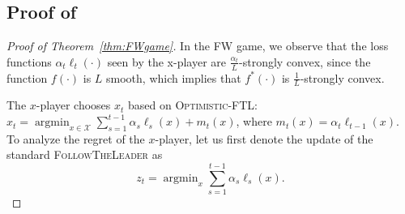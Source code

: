 \documentclass[pmlr]{jmlr} %
\def\argmin{\mathop{\arg\min}}
\def\FTL{\textsc{FollowTheLeader}\xspace}
\def\OFTL{\textsc{Optimistic-FTL}\xspace}
\newcommand{\XX}{\mathcal{X}}
\begin{document}
\subsection{Proof of }
\begin{proof}[Proof of Theorem~\ref{thm:FWgame}]
	In the FW game,
	we observe that the loss functions $\alpha_{t} \ell_{t}(\cdot)$ seen by the x-player are $\frac{\alpha_{t}}{L}$-strongly convex,
	since the function $f(\cdot)$ is $L$ smooth, which implies that $f^{*}(\cdot)$ is $\frac{1}{L}$-strongly convex.
	
	The $x$-player chooses $x_{t}$ based on \OFTL:
	$x_{t} = \argmin_{x \in \XX} \sum_{s=1}^{t-1} \alpha_{s} \ell_{s}(x) + m_{t}(x)$,
	where $m_{t}(x) = \alpha_{t} \ell_{{t-1}}(x)$.
	To analyze the regret of the $x$-player, let us first denote 
	the update of the standard \FTL as
	\begin{equation}
\textstyle	z_{t} = \argmin_{x} \sum_{s=1}^{t-1} \alpha_{s} \ell_{s}(x).
	\end{equation}
	

\end{proof}
\end{document}

